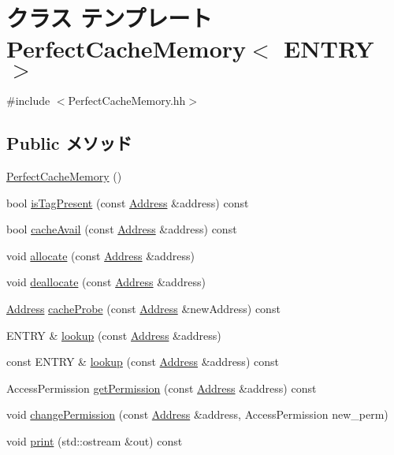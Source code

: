 \hypertarget{classPerfectCacheMemory}{
\section{クラス テンプレート PerfectCacheMemory$<$ ENTRY $>$}
\label{classPerfectCacheMemory}
}


{\ttfamily \#include $<$PerfectCacheMemory.hh$>$}\subsection*{Public メソッド}
\begin{DoxyCompactItemize}
\item 
\hyperlink{classPerfectCacheMemory_a8eb5b11992aff833dd207d5b281aecd4}{PerfectCacheMemory} ()
\item 
bool \hyperlink{classPerfectCacheMemory_a38231bf6d0b58d2b0319faa5af3135ca}{isTagPresent} (const \hyperlink{classAddress}{Address} \&address) const 
\item 
bool \hyperlink{classPerfectCacheMemory_add6ef1702fc19966e797bbebabf3cefa}{cacheAvail} (const \hyperlink{classAddress}{Address} \&address) const 
\item 
void \hyperlink{classPerfectCacheMemory_a5b0f65e7d424629299a1ade3553e5bc1}{allocate} (const \hyperlink{classAddress}{Address} \&address)
\item 
void \hyperlink{classPerfectCacheMemory_ad1a3e4943cc214363839148c7d94d6a4}{deallocate} (const \hyperlink{classAddress}{Address} \&address)
\item 
\hyperlink{classAddress}{Address} \hyperlink{classPerfectCacheMemory_aa9572469772de2df4793fa2108f5a4b9}{cacheProbe} (const \hyperlink{classAddress}{Address} \&newAddress) const 
\item 
ENTRY \& \hyperlink{classPerfectCacheMemory_abd0da9aa91ec16001a743cdfd88435c2}{lookup} (const \hyperlink{classAddress}{Address} \&address)
\item 
const ENTRY \& \hyperlink{classPerfectCacheMemory_ae4eedfdf4c0d37e8720fbc7e92b55cdf}{lookup} (const \hyperlink{classAddress}{Address} \&address) const 
\item 
AccessPermission \hyperlink{classPerfectCacheMemory_a1d0a7a05b5c02321c48531693e017b60}{getPermission} (const \hyperlink{classAddress}{Address} \&address) const 
\item 
void \hyperlink{classPerfectCacheMemory_acc96bbc477102070290a19953eff77bc}{changePermission} (const \hyperlink{classAddress}{Address} \&address, AccessPermission new\_\-perm)
\item 
void \hyperlink{classPerfectCacheMemory_ac55fe386a101fbae38c716067c9966a0}{print} (std::ostream \&out) const 
\end{DoxyCompactItemize}
